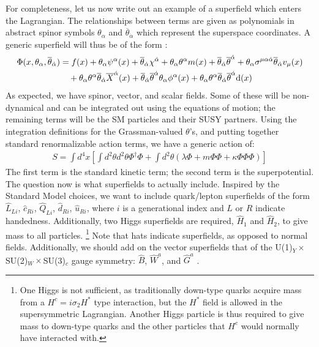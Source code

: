 For completeness, let us now write out an example of a superfield which enters the Lagrangian. The relationships between terms are given as polynomials in abstract spinor symbols $\theta_\alpha$ and $\overline{\theta}_{\dot{\alpha}}$ which represent the superspace coordinates. A generic superfield will thus be of the form \cite{Jungman}:
\begin{align}
  \Phi(x, \theta_\alpha, \overline{\theta}_{\dot{\alpha}}) &= f(x) + \theta_\alpha \psi^\alpha(x) + \overline{\theta}_{\dot{\alpha}} \chi^{\dot{\alpha}} + \theta_\alpha \theta^\alpha m(x) + \overline{\theta}_{\dot{\alpha}} \overline{\theta}^{\dot{\alpha}} + \theta_\alpha \sigma^{\mu \alpha \dot{\alpha}} \overline{\theta}_{\dot{\alpha}} v_\mu(x) \nonumber\\
  &\quad + \theta_\alpha \theta^\alpha \overline{\theta}_{\dot{\alpha}} \overline{X}^{\dot{\alpha}}(x) + \overline{\theta}_{\dot{\alpha}} \overline{\theta}^{\dot{\alpha}} \theta_\alpha \phi^\alpha (x) + \theta_\alpha \theta^\alpha \overline{\theta}_{\dot{\alpha}} \overline{\theta}^{\dot{\alpha}}\mathrm{d}(x)
\end{align}
As expected, we have spinor, vector, and scalar fields. Some of these will be non-dynamical and can be integrated out using the equations of motion; the remaining terms will be the SM particles and their SUSY partners. Using the integration definitions for the Grassman-valued $\theta$'s, and putting together standard renormalizable action terms, we have a generic action of: \cite{Jungman}
\begin{align}
  S = \int d^4 x\left[ \int d^2\theta d^2 \theta \Phi^\dagger \Phi + \int d^2\theta \left( \lambda \Phi + m \Phi \Phi + \kappa \Phi \Phi \Phi \right) \right]
\end{align}
The first term is the standard kinetic term; the second term is the superpotential. The question now is what superfields to actually include. Inspired by the Standard Model choices, we want to include quark/lepton superfields of the form $\hat{L}_{Li}$, $\hat{c}_{Ri}$, $\hat{Q}_{Li}$, $\hat{d}_{Ri}$, $\hat{u}_{Ri}$, where $i$ is a generational index and $L$ or $R$ indicate handedness. Additionally, two Higgs superfields are required, $\hat{H}_1$ and $\hat{H}_2$, to give mass to all particles. \footnote{One Higgs is not sufficient, as traditionally down-type quarks acquire mass from a $H^c = i \sigma_2 H^*$ type interaction, but the $H^*$ field is allowed in the supersymmetric Lagrangian. Another Higgs particle is thus required to give mass to down-type quarks and the other particles that $H^c$ would normally have interacted with.} Note that hats indicate superfields, as opposed to normal fields. Additionally, we should add on the vector superfields that of the U(1)$_Y\times$SU(2)$_W\times$SU(3)$_c$ gauge symmetry: $\hat{B}$, $\hat{W}^a$, and $\hat{G}^a$ \cite{Jungman}.

